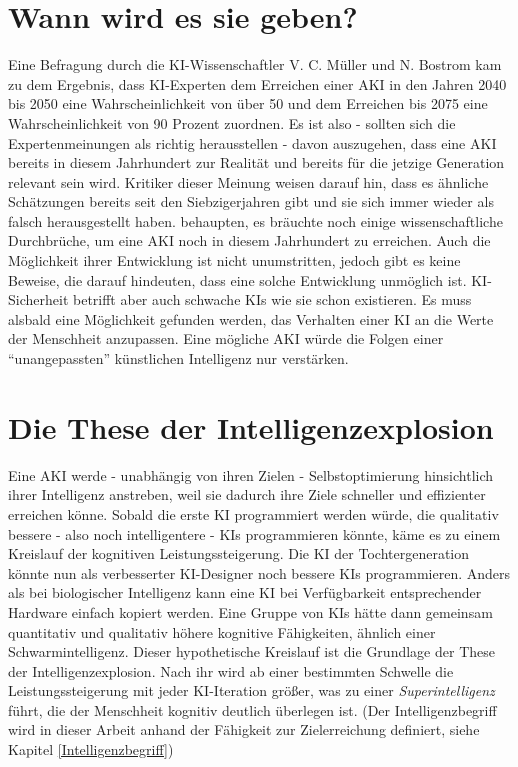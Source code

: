 \section{Wann wird es sie geben?}
Eine Befragung durch die KI-Wissenschaftler V. C. Müller und N. Bostrom kam zu dem Ergebnis, dass KI-Experten dem Erreichen einer AKI in den Jahren 2040 bis 2050 eine Wahrscheinlichkeit von über 50 und dem Erreichen bis 2075 eine Wahrscheinlichkeit von 90 Prozent zuordnen.  Es ist also - sollten sich die Expertenmeinungen als richtig herausstellen - davon auszugehen, dass eine AKI bereits in diesem Jahrhundert zur Realität und bereits für die jetzige Generation relevant sein wird. Kritiker dieser Meinung weisen darauf hin, dass es ähnliche Schätzungen bereits seit den Siebzigerjahren gibt und sie sich immer wieder als falsch herausgestellt haben. \citeauthor{allen_paul_2011} behaupten, es bräuchte noch einige wissenschaftliche Durchbrüche, um eine AKI noch in diesem Jahrhundert zu erreichen.  Auch die Möglichkeit ihrer Entwicklung ist nicht unumstritten, jedoch gibt es keine Beweise, die darauf hindeuten, dass eine solche Entwicklung unmöglich ist. KI-Sicherheit betrifft aber auch schwache KIs wie sie schon existieren. Es muss alsbald eine Möglichkeit gefunden werden, das Verhalten einer KI an die Werte der Menschheit anzupassen. Eine mögliche AKI würde die Folgen einer \enquote{unangepassten} künstlichen Intelligenz nur verstärken.

\section{Die These der Intelligenzexplosion}
Eine AKI werde - unabhängig von ihren Zielen - Selbstoptimierung hinsichtlich ihrer Intelligenz anstreben, weil sie dadurch ihre Ziele schneller und effizienter erreichen könne. Sobald die erste KI programmiert werden würde, die qualitativ bessere - also noch intelligentere - KIs programmieren könnte, käme es zu einem Kreislauf der kognitiven Leistungssteigerung. Die KI der Tochtergeneration könnte nun als verbesserter KI-Designer noch bessere KIs programmieren. Anders als bei biologischer Intelligenz kann eine KI bei Verfügbarkeit entsprechender Hardware einfach kopiert werden. Eine Gruppe von KIs hätte dann gemeinsam quantitativ und qualitativ höhere kognitive Fähigkeiten, ähnlich einer Schwarmintelligenz. Dieser hypothetische Kreislauf ist die Grundlage der These der Intelligenzexplosion. Nach ihr wird ab einer bestimmten Schwelle die Leistungssteigerung mit jeder KI-Iteration größer, was zu einer \emph{Superintelligenz} führt, die der Menschheit kognitiv deutlich überlegen ist. (Der Intelligenzbegriff wird in dieser Arbeit anhand der Fähigkeit zur Zielerreichung definiert, siehe Kapitel \ref{Intelligenzbegriff}) 

